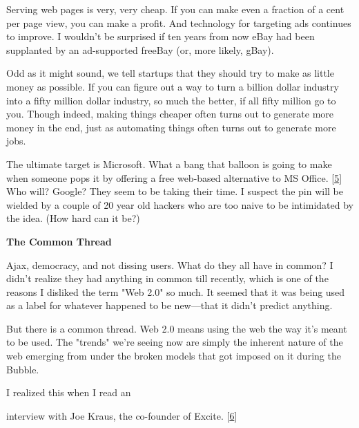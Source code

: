 Serving web pages is
                    very, very cheap. If you can make even a fraction of a cent
                    per page view, you can make a profit. And technology for
                    targeting ads continues to improve. I wouldn't be surprised
                    if ten years from now eBay had been supplanted by an
                    ad-supported freeBay (or, more likely, gBay).

Odd
                    as it might sound, we tell startups that they should try to
                    make as little money as possible. If you can figure out a
                    way to turn a billion dollar industry into a fifty million
                    dollar industry, so much the better, if all fifty million go
                    to you. Though indeed, making things cheaper often turns out
                    to generate more money in the end, just as automating things
                    often turns out to generate more jobs.

The
                    ultimate target is Microsoft. What a bang that balloon is
                    going to make when someone pops it by offering a free
                    web-based alternative to MS Office.
                    [\href{\#f5n}{5}]
                    Who will? Google? They seem to be taking their time. I
                    suspect the pin will be wielded by a couple of 20 year old
                    hackers who are too naive to be intimidated by the idea.
                    (How hard can it be?)

\textbf{The Common Thread}

Ajax, democracy, and not dissing users. What do
                    they all have in common? I didn't realize they had anything
                    in common till recently, which is one of the reasons I
                    disliked the term "Web 2.0" so much. It seemed that it was
                    being used as a label for whatever happened to be
                    new---that it didn't predict anything.

But
                    there is a common thread. Web 2.0 means using the web the
                    way it's meant to be used. The "trends" we're seeing now are
                    simply the inherent nature of the web emerging from under
                    the broken models that got imposed on it during the
                    Bubble.

I realized this when I read an
                    
                    interview with Joe Kraus, the co-founder of Excite.
                    [\href{\#f6n}{6}]
                  


